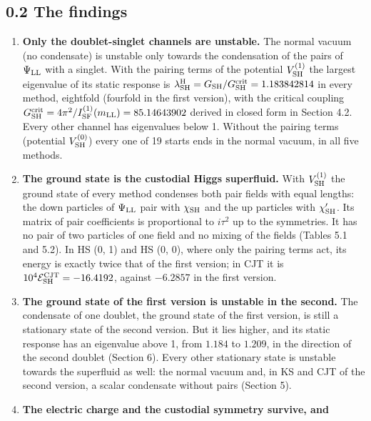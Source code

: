 \documentclass[
  10pt,
]{article}
\providecommand{\tightlist}{%
  \setlength{\itemsep}{0pt}\setlength{\parskip}{0pt}}
\begin{document}
\hypertarget{the-findings}{%
\subsection{0.2 The findings}\label{the-findings}}

\begin{enumerate}
\def\labelenumi{\arabic{enumi}.}
\tightlist
\item
  \textbf{Only the doublet-singlet channels are unstable.} The normal
  vacuum (no condensate) is unstable only towards the condensation of
  the pairs of \(\Psi_{\rm LL}\) with a singlet. With the pairing terms
  of the potential \(V^{(1)}_{\rm SH}\) the largest eigenvalue of its
  static response is
  \(\lambda^{\rm H}_{\rm SH}=G_{\rm SH}/G^{\rm crit}_{\rm SH}=1.183842814\)
  in every method, eightfold (fourfold in the first version), with the
  critical coupling
  \(G^{\rm crit}_{\rm SH}=4\pi^2/I^{(1)}_{\rm SF}(m_{\rm LL})=85.14643902\)
  derived in closed form in Section 4.2. Every other channel has
  eigenvalues below 1. Without the pairing terms (potential
  \(V^{(0)}_{\rm SH}\)) every one of 19 starts ends in the normal
  vacuum, in all five methods.
\item
  \textbf{The ground state is the custodial Higgs superfluid.} With
  \(V^{(1)}_{\rm SH}\) the ground state of every method condenses both
  pair fields with equal lengths: the down particles of
  \(\Psi_{\rm LL}\) pair with \(\chi_{\rm SH}\) and the up particles
  with \(\chi'_{\rm SH}\). Its matrix of pair coefficients is
  proportional to \(i\tau^2\) up to the symmetries. It has no pair of
  two particles of one field and no mixing of the fields (Tables 5.1 and
  5.2). In HS (0, 1) and HS (0, 0), where only the pairing terms act,
  its energy is exactly twice that of the first version; in CJT it is
  \(10^4\mathcal E^{\rm CJT}_{\rm SH}=-16.4192\), against \(-6.2857\) in
  the first version.
\item
  \textbf{The ground state of the first version is unstable in the
  second.} The condensate of one doublet, the ground state of the first
  version, is still a stationary state of the second version. But it
  lies higher, and its static response has an eigenvalue above 1, from
  \(1.184\) to \(1.209\), in the direction of the second doublet
  (Section 6). Every other stationary state is unstable towards the
  superfluid as well: the normal vacuum and, in KS and CJT of the second
  version, a scalar condensate without pairs (Section 5).
\item
  \textbf{The electric charge and the custodial symmetry survive, and
}
\end{enumerate}
\end{document}
